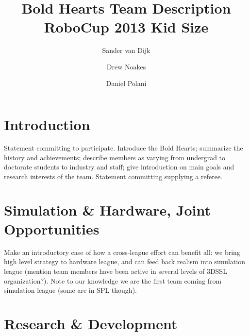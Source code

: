 \documentclass{llncs}
\title{Bold Hearts Team Description\\RoboCup 2013 Kid Size}
\author{Sander van Dijk \and Drew Noakes \and Daniel Polani}
\institute{Adaptive Systems Research Group\\School of Computer Science\\University of Hertfordshire, UK}
\begin{document}
\maketitle

%
%

\begin{abstract}
\end{abstract}

\section{Introduction}
\label{sec:introduction}

Statement committing to participate. Introduce the Bold Hearts;
summarize the history and achievements; describe members as varying
from undergrad to doctorate students to industry and staff; give
introduction on main goals and research interests of the team.
Statement committing supplying a referee.

\section{Simulation \& Hardware, Joint Opportunities}
\label{sec:simul-amp-hardw}

Make an introductory case of how a cross-league effort can benefit
all: we bring high level strategy to hardware league, and can feed
back realism into simulation league (mention team members have been
active in several levels of 3DSSL organization?). Note to our
knowledge we are the first team coming from simulation league (some
are in SPL though).

\section{Research \& Development}
\label{sec:research}
\end{document}

